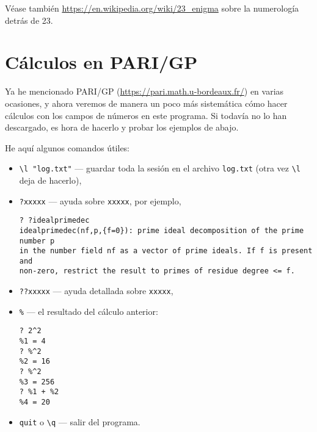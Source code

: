 Véase también \url{https://en.wikipedia.org/wiki/23_enigma}
sobre la numerología detrás de 23.


\pagebreak
\section{Cálculos en PARI/GP}

Ya he mencionado PARI/GP (\url{https://pari.math.u-bordeaux.fr/}) en varias
ocasiones, y ahora veremos de manera un poco más sistemática cómo hacer cálculos
con los campos de números en este programa. Si todavía no lo han descargado, es
hora de hacerlo y probar los ejemplos de abajo.

\vspace{1em}

He aquí algunos comandos útiles:
\begin{itemize}
\item \texttt{\textbackslash{}l "log.txt"} --- guardar toda la sesión en el archivo \texttt{log.txt} (otra vez \texttt{\textbackslash{}l} deja de hacerlo),

\item \texttt{?xxxxx} --- ayuda sobre \texttt{xxxxx}, por ejemplo,

\begin{shaded}
\begin{verbatim}
? ?idealprimedec
idealprimedec(nf,p,{f=0}): prime ideal decomposition of the prime number p
in the number field nf as a vector of prime ideals. If f is present and
non-zero, restrict the result to primes of residue degree <= f.
\end{verbatim}
\end{shaded}

\item \texttt{??xxxxx} --- ayuda detallada sobre \texttt{xxxxx},

\item \texttt{\%} --- el resultado del cálculo anterior:
  
\begin{shaded}
\begin{verbatim}
? 2^2
%1 = 4
? %^2
%2 = 16
? %^2
%3 = 256
? %1 + %2
%4 = 20
\end{verbatim}
\end{shaded}

\item \texttt{quit} o \texttt{\textbackslash{}q} --- salir del programa.
\end{itemize}

